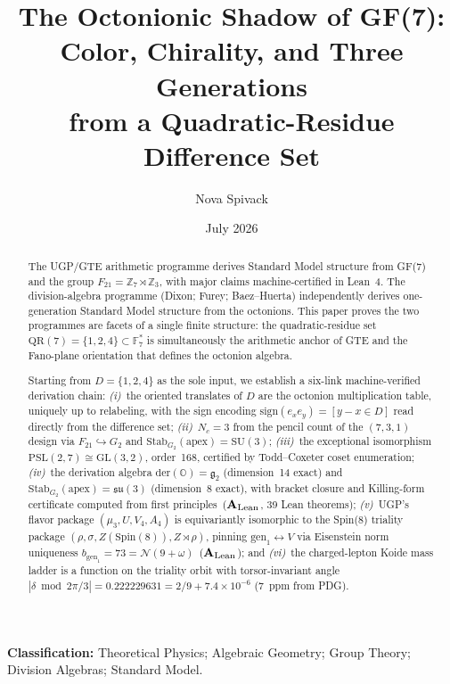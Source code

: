 \documentclass[11pt]{article}
\theoremstyle{remark}
\newcommand{\CatAL}{\ensuremath{\textbf{A}_{\rm Lean}}}
\begin{document}
\title{\textbf{The Octonionic Shadow of GF(7):}\\
  \large Color, Chirality, and Three Generations\\
  from a Quadratic-Residue Difference Set}

\author{Nova Spivack}
\date{July 2026}
\maketitle

\NovaZenodoAfterTitle

\noindent\textbf{Classification:} Theoretical Physics; Algebraic Geometry;
Group Theory; Division Algebras; Standard Model.

\begin{abstract}

The UGP/GTE arithmetic programme derives Standard Model structure from
GF(7) and the group $F_{21} = \mathbb{Z}_7\!\rtimes\!\mathbb{Z}_3$, with
major claims machine-certified in Lean~4.
The division-algebra programme (Dixon; Furey; Baez--Huerta) independently
derives one-generation Standard Model structure from the octonions.
This paper proves the two programmes are facets of a single finite structure:
the quadratic-residue set $\mathrm{QR}(7) = \{1,2,4\} \subset \mathbb{F}_7^*$
is simultaneously the arithmetic anchor of GTE and the Fano-plane orientation
that defines the octonion algebra.

Starting from $D = \{1,2,4\}$ as the sole input, we establish a six-link
machine-verified derivation chain: \emph{(i)}~the oriented translates of $D$
are the octonion multiplication table, uniquely up to relabeling, with the
sign encoding $\mathrm{sign}(e_x e_y) = [y-x\in D]$ read directly from the
difference set; \emph{(ii)}~$N_c = 3$ from the pencil count of the $(7,3,1)$
design via $F_{21}\hookrightarrow G_2$ and $\mathrm{Stab}_{G_2}(\mathrm{apex})
= \mathrm{SU}(3)$; \emph{(iii)}~the exceptional isomorphism
$\mathrm{PSL}(2,7)\cong\mathrm{GL}(3,2)$, order~168, certified by
Todd--Coxeter coset enumeration; \emph{(iv)}~the derivation algebra
$\mathrm{der}(\mathbb{O}) = \mathfrak{g}_2$ (dimension~14 exact) and
$\mathrm{Stab}_{G_2}(\mathrm{apex}) = \mathfrak{su}(3)$ (dimension~8 exact),
with bracket closure and Killing-form certificate computed from first
principles~(\CatAL, 39 Lean theorems); \emph{(v)}~UGP's flavor package
$(\mu_3, U, V_4, A_4)$ is equivariantly isomorphic to the Spin(8) triality
package $(\rho, \sigma, Z(\mathrm{Spin}(8)), Z\!\rtimes\!\rho)$, pinning
$\mathrm{gen}_1\leftrightarrow V$ via Eisenstein norm uniqueness
$b_{\mathrm{gen}_1} = 73 = \mathcal{N}(9+\omega)$~(\CatAL); and
\emph{(vi)}~the charged-lepton Koide mass ladder is a function on the
triality orbit with torsor-invariant angle $|\delta\bmod 2\pi/3|
= 0.222229631 = 2/9 + 7.4\times10^{-6}$ (7~ppm from PDG).


\end{abstract}
\end{document}
